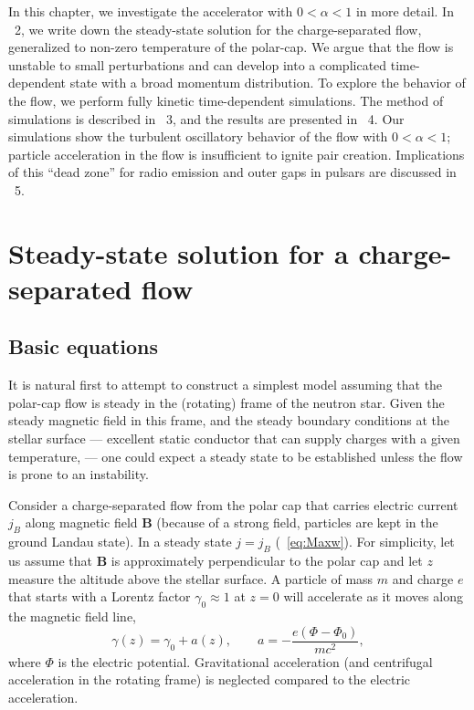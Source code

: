 In this chapter, we investigate the accelerator with $0<\alpha<1$ in more detail.
In \Sect~2, we write down the steady-state solution for the charge-separated
flow, generalized to non-zero temperature of the polar-cap. We argue that
the flow is unstable to small perturbations and can develop into a complicated
time-dependent state with a broad momentum distribution.
To explore the behavior of the flow, we perform fully kinetic
time-dependent simulations. The method of simulations is described in \Sect~3,
and the results are presented in \Sect~4.
Our simulations show the turbulent oscillatory behavior of the flow with $0<\alpha<1$;
particle acceleration in the flow is insufficient to ignite pair creation.
Implications of this ``dead zone'' for radio emission and outer gaps in pulsars
are discussed in \Sect~5.


\section{Steady-state solution for a charge-separated flow}


\subsection{Basic equations}


It is natural first to attempt to construct a simplest model
assuming that the polar-cap flow is steady in the (rotating) frame of the neutron star.
Given the steady magnetic field in this frame,
and the steady boundary conditions at the stellar surface --- excellent
static conductor that can supply charges with a given temperature, --- one
could expect a steady state to be established unless the flow is prone to an instability.

Consider a charge-separated flow from the polar cap that carries electric current
$j_B$ along magnetic field $\mathbf{B}$ (because of a strong field, particles are kept in
the ground Landau state).
In a steady state $j=j_B$ (\Eq~\ref{eq:Maxw}).
For simplicity, let us assume that $\mathbf{B}$ is approximately perpendicular to
the polar cap and let $z$ measure the altitude above the stellar surface.
A particle of mass $m$ and charge $e$ that starts with a Lorentz factor
$\gamma_0\approx 1$ at $z=0$ will accelerate as it moves along the magnetic
field line,
\begin{equation}
\label{eq:a}
    \gamma(z)=\gamma_0+a(z),  \qquad a=-\frac{e(\Phi-\Phi_0)}{mc^2},
\end{equation}
where $\Phi$ is the electric potential.
Gravitational acceleration (and centrifugal acceleration in the rotating frame) is
neglected compared to the electric acceleration.

